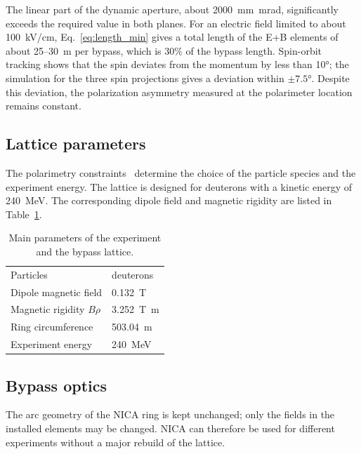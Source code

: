 The linear part of the dynamic aperture, about \SI{2000}{mm.mrad},
significantly exceeds the required value in both planes. For an electric field
limited to about \SI{100}{kV/cm}, Eq.~\eqref{eq:length_min} gives a total length of the
E+B elements of about 25--\SI{30}{m} per bypass, which is 30\% of the bypass
length. Spin-orbit tracking shows that the spin deviates from the momentum by
less than \ang{10}; the simulation for the three spin projections gives a
deviation within $\pm\ang{7.5}$. Despite this deviation, the polarization
asymmetry measured at the polarimeter location remains constant.

\subsection{Lattice parameters}

The polarimetry constraints~\cite{Kurilkin:2010ym} determine the choice of the
particle species and the experiment energy. The lattice is designed for
deuterons with a kinetic energy of \SI{240}{MeV}. The corresponding dipole
field and magnetic rigidity are listed in Table~\ref{tab:bypass_param}.

\begin{table}[htbp]
  \centering
  \caption{Main parameters of the experiment and the bypass lattice.}
  \label{tab:bypass_param}
  \begin{tabular}{ll}
    \toprule
    Particles & deuterons \\
    Dipole magnetic field & \SI{0.132}{T} \\
    Magnetic rigidity $B\rho$ & \SI{3.252}{T.m} \\
    Ring circumference & \SI{503.04}{m} \\
    Experiment energy & \SI{240}{MeV} \\
    \bottomrule
  \end{tabular}
\end{table}

\subsection{Bypass optics}

The arc geometry of the NICA ring is kept unchanged; only the fields in the
installed elements may be changed. NICA can therefore be used for different
experiments without a major rebuild of the lattice.

